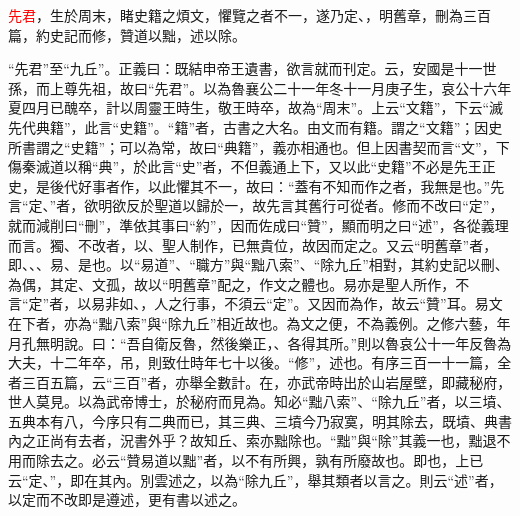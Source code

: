 \textcolor{red}{先君}，生於周末，睹史籍之煩文，懼覽之者不一，遂乃定、，明舊章，刪為三百篇，約史記而修，贊道以黜，述以除\CJKunderwave{\textcolor{red}{九丘}}。

{\noindent\shu{}\fzkt “先君”至“九丘”。正義曰：既結申帝王遺書，欲言就而刊定。云，安國是十一世孫，而上尊先祖，故曰“先君”。以為魯襄公二十一年冬十一月庚子生，哀公十六年夏四月已醜卒，計以周靈王時生，敬王時卒，故為“周末”。上云“文籍”，下云“滅先代典籍”，此言“史籍”。“籍”者，古書之大名。由文而有籍。謂之“文籍”；因史所書謂之“史籍”；可以為常，故曰“典籍”，義亦相通也。但上因書契而言“文”，下傷秦滅道以稱“典”，於此言“史”者，不但義通上下，又以此“史籍”不必是先王正史，是後代好事者作，以此懼其不一，故曰：“蓋有不知而作之者，我無是也。”先言“定、”者，欲明欲反於聖道以歸於一，故先言其舊行可從者。修而不改曰“定”，就而減削曰“刪”，準依其事曰“約”，因而佐成曰“贊”，顯而明之曰“述”，各從義理而言。獨、不改者，以、聖人制作，已無貴位，故因而定之。又云“明舊章”者，即、、、易、是也。以“易道”、“職方”與“黜八索”、“除九丘”相對，其約史記以刪、為偶，其定、文孤，故以“明舊章”配之，作文之體也。易亦是聖人所作，不言“定”者，以易非如、，人之行事，不須云“定”。又因而為作，故云“贊”耳。易文在下者，亦為“黜八索”與“除九丘”相近故也。為文之便，不為義例。之修六藝，年月孔無明說。曰：“吾自衛反魯，然後樂正，、各得其所。”則以魯哀公十一年反魯為大夫，十二年卒，吊，則致仕時年七十以後。“修”，述也。有序三百一十一篇，全者三百五篇，云“三百”者，亦舉全數計。在，亦武帝時出於山岩屋壁，即藏秘府，世人莫見。以為武帝博士，於秘府而見為。知必“黜八索”、“除九丘”者，以三墳、五典本有八，今序只有二典而已，其三典、三墳今乃寂寞，明其除去，既墳、典書內之正尚有去者，況書外乎？故知丘、索亦黜除也。“黜”與“除”其義一也，黜退不用而除去之。必云“贊易道以黜”者，以不有所興，孰有所廢故也。即也，上已云“定、”，即在其內。別雲述之，以為“除九丘”，舉其類者以言之。則云“述”者，以定而不改即是遵述，更有書以述之。 \par}

